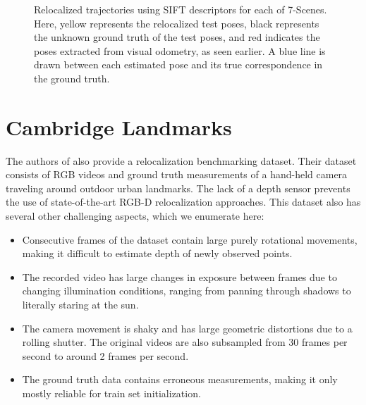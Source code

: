 \begin{figure}
	\medskip
	
	
	\caption{Relocalized trajectories using SIFT descriptors for each of 7-Scenes. Here, yellow represents the relocalized test poses, black represents the unknown ground truth of the test poses, and red indicates the poses extracted from visual odometry, as seen earlier. A blue line is drawn between each estimated pose and its true correspondence in the ground truth.}
	\label{fig:reloc_7scenes}
\end{figure}

\section{Cambridge Landmarks}

The authors of \cite{kendall2015posenet} also provide a relocalization benchmarking dataset. Their dataset consists of RGB videos and ground truth measurements of a hand-held camera traveling around outdoor urban landmarks. The lack of a depth sensor prevents the use of state-of-the-art RGB-D relocalization approaches. This dataset also has several other challenging aspects, which we enumerate here:
\begin{itemize}
	\item Consecutive frames of the dataset contain large purely rotational movements, making it difficult to estimate depth of newly observed points.
	\item The recorded video has large changes in exposure between frames due to changing illumination conditions, ranging from panning through shadows to literally staring at the sun.
	\item The camera movement is shaky and has large geometric distortions due to a rolling shutter. The original videos are also subsampled from 30 frames per second to around 2 frames per second.
	\item The ground truth data contains erroneous measurements, making it only mostly reliable for train set initialization.
\end{itemize}

